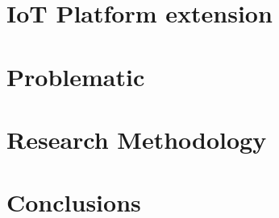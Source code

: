 \documentclass[11pt]{article}
\begin{document}
\section{IoT Platform extension}



\section{Problematic}


\section{Research Methodology}


\section{Conclusions}


\newpage
\listoffigures
\nocite{*}
\printbibliography
\end{document}
